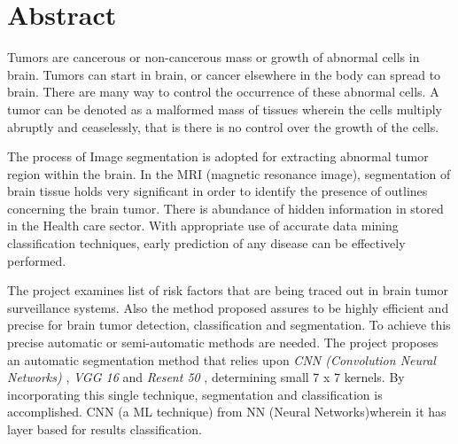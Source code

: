\documentclass[10pt]{report}
\begin{document}
	

	

	

	\tableofcontents

	\chapter{Abstract}


	\thispagestyle{plain}

	Tumors are cancerous or non-cancerous mass or growth of abnormal cells in
	brain. Tumors can start in brain, or cancer elsewhere in the body can spread
	to brain. There are many way to control the occurrence of these abnormal
	cells. A tumor can be denoted as a malformed mass of tissues wherein the
	cells multiply abruptly and ceaselessly, that is there is no control over
	the growth of the cells.

	The process of Image segmentation is adopted for extracting abnormal tumor
	region within the brain. In the MRI (magnetic resonance image), segmentation
	of brain tissue holds very significant in order to identify the presence of
	outlines concerning the brain tumor. There is abundance of hidden
	information in stored in the Health care sector. With appropriate use of
	accurate data mining classification techniques, early prediction of any
	disease can be effectively performed.

	The project examines list of risk factors that are being traced out in brain
	tumor surveillance systems. Also the method proposed assures to be highly
	efficient and precise for brain tumor detection, classification and
	segmentation. To achieve this precise automatic or semi-automatic methods
	are needed. The project proposes an automatic segmentation method that
	relies upon \textit{ CNN (Convolution Neural Networks) }, \textit{ VGG 16 }
	and \textit{ Resent 50 }, determining small 7 x 7 kernels. By incorporating
	this single technique, segmentation and classification is accomplished. CNN
	(a ML technique) from NN (Neural Networks)wherein it has layer based for
	results classification.
\end{document}
